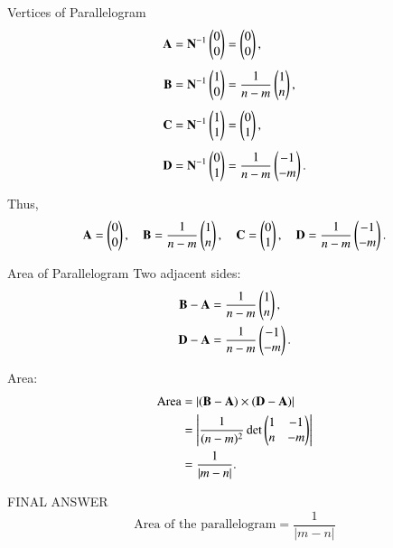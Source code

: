 \documentclass{beamer}
\begin{document}
\begin{frame}{Vertices of Parallelogram}
\begin{align}
\mathbf{A} &= \mathbf{N}^{-1}\begin{pmatrix}0 \\ 0\end{pmatrix} 
= \begin{pmatrix}0 \\ 0\end{pmatrix},\\[4pt]
\mathbf{B} &= \mathbf{N}^{-1}\begin{pmatrix}1 \\ 0\end{pmatrix} 
= \frac{1}{n-m}\begin{pmatrix}1 \\ n\end{pmatrix},\\[4pt]
\mathbf{C} &= \mathbf{N}^{-1}\begin{pmatrix}1 \\ 1\end{pmatrix} 
= \begin{pmatrix}0 \\ 1\end{pmatrix},\\[4pt]
\mathbf{D} &= \mathbf{N}^{-1}\begin{pmatrix}0 \\ 1\end{pmatrix} 
= \frac{1}{n-m}\begin{pmatrix}-1 \\ -m\end{pmatrix}.
\end{align}

Thus,
\begin{align}
\mathbf{A} = \begin{pmatrix}0 \\ 0\end{pmatrix}, \quad
\mathbf{B} = \frac{1}{n-m}\begin{pmatrix}1 \\ n\end{pmatrix}, \quad
\mathbf{C} = \begin{pmatrix}0 \\ 1\end{pmatrix}, \quad
\mathbf{D} = \frac{1}{n-m}\begin{pmatrix}-1 \\ -m\end{pmatrix}.
\end{align}
\end{frame}

\begin{frame}{Area of Parallelogram}
Two adjacent sides:
\begin{align}
\mathbf{B}-\mathbf{A} &= \frac{1}{n-m}\begin{pmatrix}1 \\ n\end{pmatrix},\\
\mathbf{D}-\mathbf{A} &= \frac{1}{n-m}\begin{pmatrix}-1 \\ -m\end{pmatrix}.
\end{align}

Area:
\begin{align}
\text{Area} 
&= \left\vert(\mathbf{B}-\mathbf{A}) \times (\mathbf{D}-\mathbf{A})\right\vert \\
&= \left|\frac{1}{(n-m)^2}
\det\begin{pmatrix}1 & -1 \\ n & -m\end{pmatrix}\right|\\
&= \frac{1}{|m - n|}.
\end{align}
\end{frame}
\begin{frame}{FINAL ANSWER}
    \[
\boxed{\text{Area of the parallelogram} = \frac{1}{|m - n|}}
\]
\end{frame}
\end{document}
